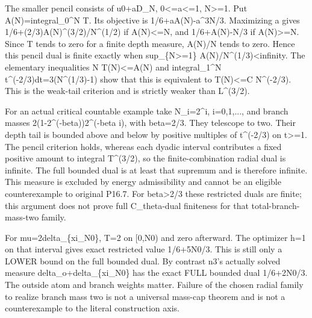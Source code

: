 \documentclass[11pt]{article}
\begin{document}
The smaller pencil consists of u0+aD\_N, 0<=a<=1, N>=1. Put A(N)=integral\_0\textasciicircum{}N T. Its objective is 1/6+aA(N)-a\textasciicircum{}3N/3. Maximizing a gives 1/6+(2/3)A(N)\textasciicircum{}(3/2)/N\textasciicircum{}(1/2) if A(N)<=N, and 1/6+A(N)-N/3 if A(N)>=N. Since T tends to zero for a finite depth measure, A(N)/N tends to zero. Hence this pencil dual is finite exactly when sup\_\{N>=1\} A(N)/N\textasciicircum{}(1/3)<infinity. The elementary inequalities N T(N)<=A(N) and integral\_1\textasciicircum{}N t\textasciicircum{}(-2/3)dt=3(N\textasciicircum{}(1/3)-1) show that this is equivalent to T(N)<=C N\textasciicircum{}(-2/3). This is the weak-tail criterion and is strictly weaker than L\textasciicircum{}(3/2).

For an actual critical countable example take N\_i=2\textasciicircum{}i, i=0,1,..., and branch masses 2(1-2\textasciicircum{}(-beta))2\textasciicircum{}(-beta i), with beta=2/3. They telescope to two. Their depth tail is bounded above and below by positive multiples of t\textasciicircum{}(-2/3) on t>=1. The pencil criterion holds, whereas each dyadic interval contributes a fixed positive amount to integral T\textasciicircum{}(3/2), so the finite-combination radial dual is infinite. The full bounded dual is at least that supremum and is therefore infinite. This measure is excluded by energy admissibility and cannot be an eligible counterexample to original P16.7. For beta>2/3 these restricted duals are finite; this argument does not prove full C\_theta-dual finiteness for that total-branch-mass-two family.

For mu=2delta\_\{xi\_N0\}, T=2 on [0,N0) and zero afterward. The optimizer h=1 on that interval gives exact restricted value 1/6+5N0/3. This is still only a LOWER bound on the full bounded dual. By contrast n3's actually solved measure delta\_o+delta\_\{xi\_N0\} has the exact FULL bounded dual 1/6+2N0/3. The outside atom and branch weights matter. Failure of the chosen radial family to realize branch mass two is not a universal mass-cap theorem and is not a counterexample to the literal construction axis.
\end{document}
